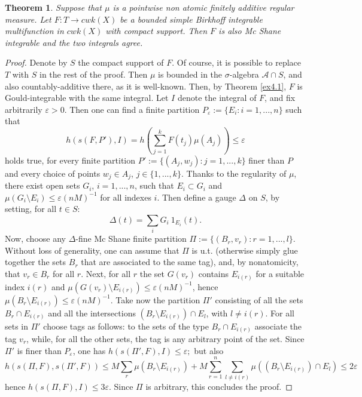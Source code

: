 \documentclass[11pt,a4paper,twoside]{amsart}
\newtheorem{theorem}{Theorem}[section]
\begin{document}
\begin{theorem}\label{wbvms-fa}
Suppose that $\mu$ is a pointwise non atomic finitely additive regular
 measure. Let $F: T \rightarrow cwk(X)$ be a bounded  simple Birkhoff integrable multifunction  
 in $cwk(X)$ with compact support. Then $F$ is also  Mc Shane integrable and the two integrals agree.
\end{theorem}
\begin{proof}
Denote by $S$ the compact support of $F$. Of course, it is possible to replace $T$ with $S$ in the rest of the proof. Then $\mu$ is bounded in the $\sigma$-algebra $\mathcal{A}\cap S$, and also countably-additive there, as it is well-known. Then, by Theorem
 \ref{ex4.1}, $F$ is Gould-integrable with the same integral. Let $I$ denote the integral of $F$, and fix arbitrarily ${\varepsilon}>0$. Then one can find  a finite partition $P_{\varepsilon}:=\{E_i:i=1,...,n\}$ such that 
$$h(s(F,P'),I)=h\left(\sum_{j=1}^kF(t_j)\mu(A_j)\right)\leq {\varepsilon}$$
holds true, for every finite partition $P':=\{(A_j,w_j):j=1,...,k\}$ finer than $P$ and every choice of points $w_j\in A_j$, $j\in\{1,...,k\}$.
Thanks to the regularity of $\mu$, there exist open sets $G_i$, $i=1,...,n$, such that $E_i\subset G_i$ and $\mu(G_i\setminus E_i)\leq {\varepsilon} (nM)^{-1}$ for all indexes $i$.  Then define a gauge $\Delta$ on $S$, by setting, for all $t\in S$:
$$\Delta(t)=\sum_iG_i\ 1_{E_i}(t).$$
Now, choose any $\Delta$-fine Mc Shane finite partition $\Pi:=\{(B_r,v_r):r=1,...,l\}$.
Without loss of generality, one can assume that $\Pi$ is u.t. (otherwise simply glue together the sets $B_r$ that are associated to the same tag), and, by nonatomicity, that $v_r\in B_r$ for all $r$. Next, for all $r$ the set $G(v_r)$ contains $E_{i(r)}$ for a suitable index $i(r)$ and $\mu(G(v_r)\setminus E_{i(r)})\leq {\varepsilon} (nM)^{-1}$, hence $\mu(B_r\setminus E_{i(r)})\leq {\varepsilon} (nM)^{-1}$.
Take now the partition $\Pi'$ consisting of all the sets $B_r\cap E_{i(r)}$ and all the intersections $(B_r\setminus E_{i(r)})\cap E_l$, with $l\neq i(r)$. For all sets in $\Pi'$ choose tags as follows: to the sets of the type $B_r\cap E_{i(r)}$ associate the tag  $v_r$, while, for all the other sets, the tag is any arbitrary point  of the set.
Since $\Pi'$ is finer than $P_{\varepsilon}$, one has
$h(s(\Pi',F),I)\leq {\varepsilon};$
but also
$$h(s(\Pi,F),s(\Pi',F))\leq M\sum_{r}\mu(B_r\setminus E_{i(r)})+M\sum_{r=1}^n\sum_{l\neq i(r)}\mu((B_r\setminus E_{i(r)})\cap E_l)\leq 2{\varepsilon}$$
hence 
$h(s(\Pi,F),I)\leq 3{\varepsilon}.$
Since $\Pi$ is arbitrary, this concludes the proof. 
\end{proof}
\end{document}
